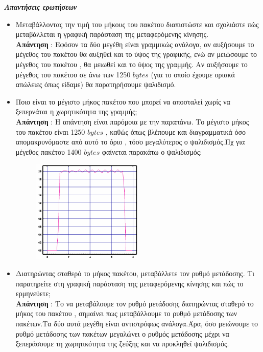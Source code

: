 \documentclass{article}%
\begin{document}
\textsl{\textbf{Απαντήσεις ερωτήσεων}}
\begin{itemize}
	\item Μεταβάλλοντας την τιμή του μήκους του πακέτου διαπιστώστε και σχολιάστε πώς μεταβάλλεται η
γραφική παράσταση της μεταφερόμενης κίνησης. \\
\textbf{Απάντηση} : Εφόσον τα δύο μεγέθη είναι γραμμικώς ανάλογα, αν αυξήσουμε το μέγεθος του πακέτου θα αυξηθεί και το ύψος της γραφικής, ενώ αν μειώσουμε το μέγεθος του πακέτου , θα μειωθεί και το ύψος της γραμμής. Αν αυξήσουμε το μέγεθος του πακέτου σε άνω των 1250 $bytes$ (για το οποίο έχουμε οριακά απώλειες όπως είδαμε) θα παρατηρήσουμε ψαλιδισμό.
\item Ποιο είναι το μέγιστο μήκος πακέτου που μπορεί να αποσταλεί χωρίς να ξεπερνάται η
χωρητικότητα της γραμμής; \\
\textbf{Απάντηση} : Η απάντηση είναι παρόμοια με την παραπάνω. Το μέγιστο μήκος του πακέτου είναι 1250 $bytes$ , καθώς όπως βλέπουμε και διαγραμματικά όσο απομακρυνόμαστε από αυτό το όριο , τόσο μεγαλύτερος ο ψαλιδισμός.Πχ για μέγεθος πακέτου 1400 $bytes$ φαίνεται παρακάτω ο ψαλιδισμός:
\begin{figure}[htbp]
	\centering
		\includegraphics[width=0.50\textwidth]{4.png}
\end{figure}
\item Διατηρώντας σταθερό το μήκος πακέτου, μεταβάλλετε τον ρυθμό μετάδοσης. Τι παρατηρείτε στη
γραφική παράσταση της μεταφερόμενης κίνησης και πώς το ερμηνεύετε; \\
\textbf{Απάντηση} : Το να μεταβάλουμε τον ρυθμό μετάδοσης διατηρώντας σταθερό το μήκος του πακέτου , σημαίνει πως μεταβάλλουμε το ρυθμό μετάδοσης των πακέτων.Τα δύο αυτά μεγέθη είναι αντιστρόφως ανάλογα.Άρα, όσο μειώνουμε το ρυθμό μετάδοσης των πακέτων μεγαλώνει ο ρυθμός μετάδοσης μέχρι να ξεπεράσουμε τη χωρητικότητα της ζεύξης και να προκληθεί ψαλιδισμός.


\end{itemize}
\end{document}
